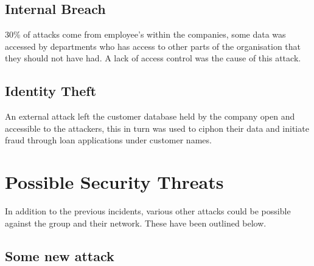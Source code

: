 \subsection{Internal Breach}
30\% of attacks come from employee’s within the companies, some data was accessed by departments who has access to other parts of the organisation that they should not have had. A lack of access control was the cause of this attack.
\subsection{Identity Theft}
An external attack left the customer database held by the company open and accessible to the attackers, this in turn was used to ciphon their data and initiate fraud through loan applications under customer names.
\section{Possible Security Threats}
In addition to the previous incidents, various other attacks could be possible against the group and their network. These have been outlined below.
\subsection{Some new attack}